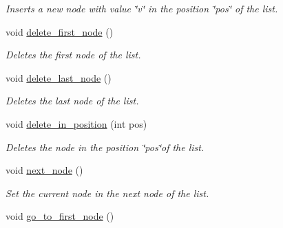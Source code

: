\begin{DoxyCompactItemize}
\begin{DoxyCompactList}\small\item\em Inserts a new node with value \char`\"{}v\char`\"{} in the position \char`\"{}pos\char`\"{} of the list. \end{DoxyCompactList}\item 
\hypertarget{classlist_a9442b8d51977d2e334668c5af309b0a6}{void \hyperlink{classlist_a9442b8d51977d2e334668c5af309b0a6}{delete\-\_\-first\-\_\-node} ()}\label{classlist_a9442b8d51977d2e334668c5af309b0a6}

\begin{DoxyCompactList}\small\item\em Deletes the first node of the list. \end{DoxyCompactList}\item 
\hypertarget{classlist_a940e14191c9749919d81be840b1ce163}{void \hyperlink{classlist_a940e14191c9749919d81be840b1ce163}{delete\-\_\-last\-\_\-node} ()}\label{classlist_a940e14191c9749919d81be840b1ce163}

\begin{DoxyCompactList}\small\item\em Deletes the last node of the list. \end{DoxyCompactList}\item 
\hypertarget{classlist_aad82eb6c4ac56b4d52ceb292aef40232}{void \hyperlink{classlist_aad82eb6c4ac56b4d52ceb292aef40232}{delete\-\_\-in\-\_\-position} (int pos)}\label{classlist_aad82eb6c4ac56b4d52ceb292aef40232}

\begin{DoxyCompactList}\small\item\em Deletes the node in the position \char`\"{}pos\char`\"{}of the list. \end{DoxyCompactList}\item 
\hypertarget{classlist_ab11707b9d85a5c33d0bebf8944c0e857}{void \hyperlink{classlist_ab11707b9d85a5c33d0bebf8944c0e857}{next\-\_\-node} ()}\label{classlist_ab11707b9d85a5c33d0bebf8944c0e857}

\begin{DoxyCompactList}\small\item\em Set the current node in the next node of the list. \end{DoxyCompactList}\item 
\hypertarget{classlist_afb9c1a47eb001496eabd2d3ac37d283d}{void \hyperlink{classlist_afb9c1a47eb001496eabd2d3ac37d283d}{go\-\_\-to\-\_\-first\-\_\-node} ()}\label{classlist_afb9c1a47eb001496eabd2d3ac37d283d}


\end{DoxyCompactItemize}
